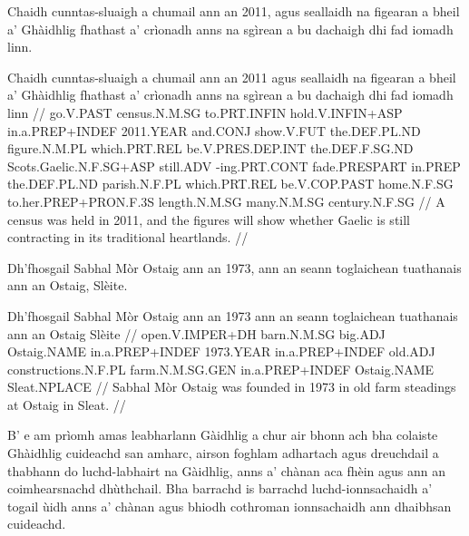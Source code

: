 \documentclass[a4paper,10pt]{article}
\begin{document}
\ex
\begingl
\glpre Chaidh cunntas-sluaigh a chumail ann an 2011, agus seallaidh na figearan a bheil a' Ghàidhlig fhathast a' crìonadh anns na sgìrean a bu dachaigh dhi fad iomadh linn. 

\vspace{4mm}
\gla Chaidh cunntas-sluaigh a chumail {ann an} 2011 agus seallaidh na figearan a bheil a' Ghàidhlig fhathast a' crìonadh anns na sgìrean a bu dachaigh dhi fad iomadh linn  //
\glb go.V.PAST census.N.M.SG to.PRT.INFIN hold.V.INFIN+ASP in.a.PREP+INDEF 2011.YEAR and.CONJ show.V.FUT the.DEF.PL.ND figure.N.M.PL which.PRT.REL be.V.PRES.DEP.INT the.DEF.F.SG.ND Scots.Gaelic.N.F.SG+ASP still.ADV -ing.PRT.CONT fade.PRESPART in.PREP the.DEF.PL.ND parish.N.F.PL which.PRT.REL be.V.COP.PAST home.N.F.SG to.her.PREP+PRON.F.3S length.N.M.SG many.N.M.SG century.N.F.SG  //
\glft A census was held in 2011, and the figures will show whether Gaelic is still contracting in its traditional heartlands. //
\endgl
\xe

\ex
\begingl
\glpre Dh'fhosgail Sabhal Mòr Ostaig ann an 1973, ann an seann toglaichean tuathanais ann an Ostaig, Slèite. 

\vspace{4mm}
\gla Dh'fhosgail Sabhal Mòr Ostaig {ann an} 1973 {ann an} seann toglaichean tuathanais {ann an} Ostaig Slèite  //
\glb open.V.IMPER+DH barn.N.M.SG big.ADJ Ostaig.NAME in.a.PREP+INDEF 1973.YEAR in.a.PREP+INDEF old.ADJ constructions.N.F.PL farm.N.M.SG.GEN in.a.PREP+INDEF Ostaig.NAME Sleat.NPLACE  //
\glft Sabhal Mòr Ostaig was founded in 1973 in old farm steadings at Ostaig in Sleat. //
\endgl
\xe

\ex
\begingl
\glpre B' e am prìomh amas leabharlann Gàidhlig a chur air bhonn ach bha colaiste Ghàidhlig cuideachd san amharc, airson foghlam adhartach agus dreuchdail a thabhann do luchd-labhairt na Gàidhlig, anns a' chànan aca fhèin agus ann an coimhearsnachd dhùthchail. Bha barrachd is barrachd luchd-ionnsachaidh a' togail ùidh anns a' chànan agus bhiodh cothroman ionnsachaidh ann dhaibhsan cuideachd. 
\end{document}

